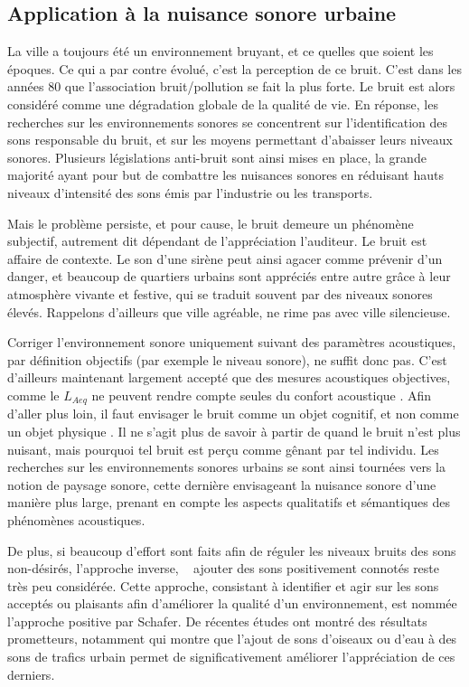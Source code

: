 \subsection{Application à la nuisance sonore urbaine}

La ville a toujours été un environnement bruyant, et ce quelles que soient les époques. Ce qui a par contre évolué, c'est la perception de ce bruit. C'est dans les années 80 que l'association bruit/pollution se fait la plus forte. Le bruit est alors considéré comme une dégradation globale de la qualité de vie. En réponse, les recherches sur les environnements sonores se concentrent sur l'identification des sons responsable du bruit, et sur les moyens permettant d'abaisser leurs niveaux sonores. Plusieurs législations anti-bruit sont ainsi mises en place, la grande majorité ayant pour but de combattre les nuisances sonores en réduisant hauts niveaux d'intensité des sons émis par l'industrie ou les transports.

Mais le problème persiste, et pour cause, le bruit demeure un phénomène subjectif, autrement dit dépendant de l'appréciation l'auditeur. Le bruit est affaire de contexte. Le son d'une sirène peut ainsi agacer comme prévenir d'un danger, et beaucoup de quartiers urbains sont appréciés entre autre grâce à leur atmosphère vivante et festive, qui se traduit souvent par des niveaux sonores élevés. Rappelons d'ailleurs que ville agréable, ne rime pas avec ville silencieuse.  


Corriger l'environnement sonore uniquement suivant des paramètres acoustiques, par définition objectifs (par exemple le niveau sonore), ne suffit donc pas. C'est d'ailleurs maintenant largement accepté que des mesures acoustiques objectives, comme le $L_{Aeq}$ ne peuvent rendre compte seules du confort acoustique \citep{yang2005acoustic,schulte2006soundscape,kang2010semantic,aletta2016soundscape}. Afin d'aller plus loin, il faut envisager le bruit comme un objet cognitif, et non comme un objet physique \citep{guastavino_etude_2003}. Il ne s'agit plus de savoir à partir de quand le bruit n'est plus nuisant, mais pourquoi tel bruit est perçu comme gênant par tel individu. Les recherches sur les environnements sonores urbains se sont ainsi tournées vers la notion de paysage sonore, cette dernière envisageant la nuisance sonore d'une manière plus large, prenant en compte les aspects qualitatifs et sémantiques des phénomènes acoustiques. 

De plus, si beaucoup d’effort sont faits afin de réguler les niveaux bruits des sons non-désirés,  l'approche inverse, \ie~ ajouter des sons positivement connotés reste très peu considérée. Cette approche, consistant à identifier et agir sur les sons acceptés ou plaisants afin d'améliorer la qualité d'un environnement, est nommée l'approche positive par Schafer. De récentes études ont montré des résultats prometteurs, notamment \citep{hong2013designing} qui montre que l'ajout de sons d'oiseaux ou d'eau à des sons de trafics urbain permet de significativement améliorer l'appréciation de ces derniers.

